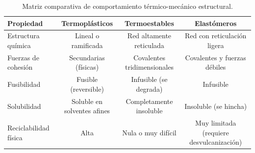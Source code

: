 \begin{table}[h]
    \centering
    \caption{Matriz comparativa de comportamiento térmico-mecánico estructural.}
    \label{tab:matriz_termico}
    \begin{tabular}{lccc}
        \toprule
        \textbf{Propiedad} & \textbf{Termoplásticos} & \textbf{Termoestables} & \textbf{Elastómeros} \\
        \midrule
        Estructura química & Lineal o ramificada & Red altamente reticulada & Red con reticulación ligera \\
        Fuerzas de cohesión & Secundarias (físicas) & Covalentes tridimensionales & Covalentes y fuerzas débiles \\
        Fusibilidad & Fusible (reversible) & Infusible (se degrada) & Infusible \\
        Solubilidad & Soluble en solventes afines & Completamente insoluble & Insoluble (se hincha) \\
        Reciclabilidad física & Alta & Nula o muy difícil & Muy limitada (requiere desvulcanización) \\
        \bottomrule
    \end{tabular}
\end{table}
